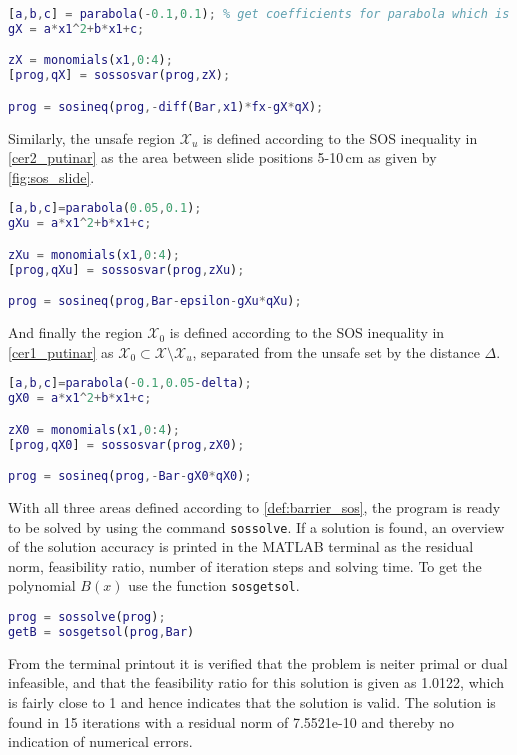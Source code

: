 \begin{lstlisting}[language=matlab]
% Define space X in Rn
[a,b,c] = parabola(-0.1,0.1); % get coefficients for parabola which is positive for x in [-0.1,0.1] m
gX = a*x1^2+b*x1+c;

zX = monomials(x1,0:4);
[prog,qX] = sossosvar(prog,zX);

prog = sosineq(prog,-diff(Bar,x1)*fx-gX*qX);
\end{lstlisting}
Similarly, the unsafe region $\mathcal{X}_u$ is defined according to the SOS inequality in \autoref{cer2_putinar} as the area between slide positions 5-10\,cm as given by \autoref{fig:sos_slide}.
\begin{lstlisting}[language=matlab]
% Define space Xu in X
[a,b,c]=parabola(0.05,0.1);
gXu = a*x1^2+b*x1+c;

zXu = monomials(x1,0:4);
[prog,qXu] = sossosvar(prog,zXu);

prog = sosineq(prog,Bar-epsilon-gXu*qXu);
\end{lstlisting}
And finally the region $\mathcal{X}_0$ is defined according to the SOS inequality in \autoref{cer1_putinar} as $\mathcal{X}_0\subset\mathcal{X}\setminus\mathcal{X}_u$, separated from the unsafe set by the distance $\Delta$.
\begin{lstlisting}[language=matlab]
% Define space X0 in X
[a,b,c]=parabola(-0.1,0.05-delta);
gX0 = a*x1^2+b*x1+c;

zX0 = monomials(x1,0:4);
[prog,qX0] = sossosvar(prog,zX0);

prog = sosineq(prog,-Bar-gX0*qX0);
\end{lstlisting}
With all three areas defined according to \autoref{def:barrier_sos}, the program is ready to be solved by using the command \texttt{sossolve}. If a solution is found, an overview of the solution accuracy is printed in the MATLAB terminal as the residual norm, feasibility ratio, number of iteration steps and solving time. To get the polynomial $B(x)$ use the function \texttt{sosgetsol}.
\begin{lstlisting}[language=matlab]
% Solve for barrier certificate
prog = sossolve(prog);
getB = sosgetsol(prog,Bar)
\end{lstlisting}

\vspace{-2mm}
From the terminal printout it is verified that the problem is neiter primal or dual infeasible, and that the feasibility ratio for this solution is given as 1.0122, which is fairly close to 1 and hence indicates that the solution is valid. The solution is found in 15 iterations with a residual norm of 7.5521e-10 and thereby no indication of numerical errors.

